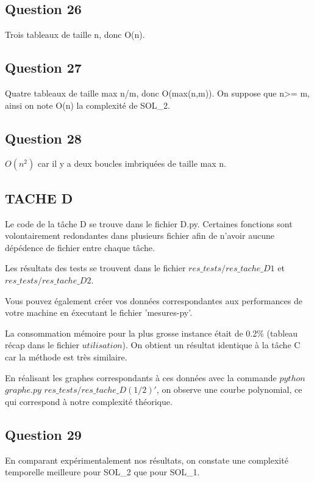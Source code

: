 \documentclass{report}
\begin{document}
\subsection*{Question 26}
Trois tableaux de taille n, donc O(n).

\subsection*{Question 27}
Quatre tableaux de taille max n/m, donc O(max(n,m)). On suppose que n>= m, ainsi on note O(n) la complexité de SOL\_2.

\subsection*{Question 28}
$O(n^{2})$ car il y a deux boucles imbriquées de taille max n.

\begin{center}

\subsection*{TACHE D}
Le code de la tâche D se trouve dans le fichier D.py. Certaines fonctions sont volontairement redondantes dans plusieurs fichier afin de n'avoir aucune dépédence de fichier entre chaque tâche.

Les résultats des tests se trouvent dans le fichier $res\_tests/res\_tache\_D1$ et $res\_tests/res\_tache\_D2$.

Vous pouvez également créer vos données correspondantes aux performances de votre machine en éxecutant le fichier 'mesures-py'.


La consommation mémoire pour la plus grosse instance était de 0.2\% (tableau récap dans le fichier $utilisation$).  On obtient un résultat identique à la tâche C car la méthode est très similaire.

En réalisant les graphes correspondants à ces données avec la commande  $python$ $graphe.py$ $res\_tests/res\_tache\_D(1/2)' $, on observe une courbe polynomial, ce qui correspond à notre complexité théorique.
\end{center}

\subsection*{Question 29}
En comparant expérimentalement nos résultats, on constate une complexité temporelle meilleure pour SOL\_2 que pour SOL\_1.
\end{document}
